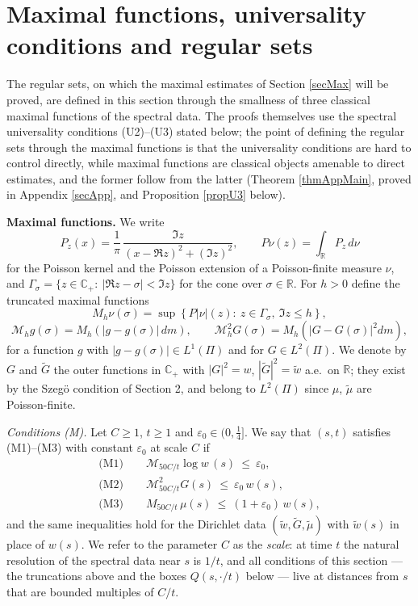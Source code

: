 \documentclass[11pt,twoside,reqno]{amsart}
\def\ti{\tilde}
\def\R{{\mathbb R}}
\def\C{{\mathbb{C}}}
\def\MM{{\mathcal M}}
\def\e{\varepsilon}
\def\G{\Gamma}
\def\s{\sigma}
\theoremstyle{plain}
\numberwithin{equation}{section}
\begin{document}
\section{Maximal functions, universality conditions and regular sets}\label{secU}

The regular sets, on which the maximal estimates of Section \ref{secMax} will be proved, are defined in this section through the smallness of three classical maximal functions of the spectral data. The proofs themselves use the spectral universality conditions (U2)--(U3) stated below; the point of defining the regular sets through the maximal functions is that the universality conditions are hard to control directly, while maximal functions are classical objects amenable to direct estimates, and the former follow from the latter (Theorem \ref{thmAppMain}, proved in Appendix \ref{secApp}, and Proposition \ref{propU3} below).

{\bf Maximal functions.} We write
$$P_z(x)=\frac1\pi\,\frac{\Im z}{(x-\Re z)^2+(\Im z)^2},\qquad P\nu(z)=\int_\R P_z\,d\nu$$
for the Poisson kernel and the Poisson extension of a Poisson-finite measure $\nu$, and $\G_\s=\{z\in\C_+:\ |\Re z-\s|<\Im z\}$ for the cone over $\s\in\R$. For $h>0$ define the truncated maximal functions
$$M_h\nu(\s)=\sup\left\{P|\nu|(z):\ z\in\G_\s,\ \Im z\leq h\right\},$$
$$\MM_h g(\s)=M_h\!\left(|g-g(\s)|\,dm\right),\qquad
\MM^2_h G(\s)=M_h\!\left(|G-G(\s)|^2dm\right),$$
for a function $g$ with $|g-g(\s)|\in L^1(\Pi)$ and for $G\in L^2(\Pi)$. We denote by $G$ and $\ti G$ the outer functions in $\C_+$ with $|G|^2=w$, $|\ti G|^2=\ti w$ a.e.\ on $\R$; they exist by the Szeg\"o condition of Section 2, and belong to $L^2(\Pi)$ since $\mu$, $\ti\mu$ are Poisson-finite.

{\it Conditions (M).} Let $C\geq1$, $t\geq1$ and $\e_0\in(0,\tfrac14]$. We say that $(s,t)$ satisfies {\rm(M1)--(M3)} with constant $\e_0$ at scale $C$ if
$$\begin{gathered}
\text{(M1)}\qquad \MM_{50C/t}\!\log w\,(s)\ \leq\ \e_0,\\
\text{(M2)}\qquad \MM^2_{50C/t}G(s)\ \leq\ \e_0\,w(s),\\
\text{(M3)}\qquad M_{50C/t}\,\mu(s)\ \leq\ (1+\e_0)\,w(s),
\end{gathered}$$
and the same inequalities hold for the Dirichlet data $(\ti w,\ti G,\ti\mu)$ with $\ti w(s)$ in place of $w(s)$. We refer to the parameter $C$ as the {\it scale}: at time $t$ the natural resolution of the spectral data near $s$ is $1/t$, and all conditions of this section --- the truncations above and the boxes $Q(s,\cdot/t)$ below --- live at distances from $s$ that are bounded multiples of $C/t$.
\end{document}
